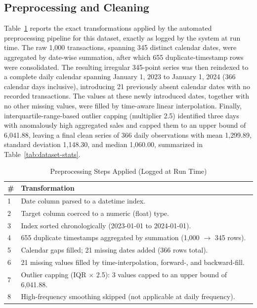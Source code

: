 \subsection{Preprocessing and Cleaning}
Table~\ref{tab:preprocessing-steps} reports the exact transformations applied by the automated preprocessing pipeline for this dataset, exactly as logged by the system at run time. The raw 1{,}000 transactions, spanning 345 distinct calendar dates, were aggregated by date-wise summation, after which 655 duplicate-timestamp rows were consolidated. The resulting irregular 345-point series was then reindexed to a complete daily calendar spanning January 1, 2023 to January 1, 2024 (366 calendar days inclusive), introducing 21 previously absent calendar dates with no recorded transactions. The values at these newly introduced dates, together with no other missing values, were filled by time-aware linear interpolation. Finally, interquartile-range-based outlier capping (multiplier 2.5) identified three days with anomalously high aggregated sales and capped them to an upper bound of 6{,}041.88, leaving a final clean series of 366 daily observations with mean 1{,}299.89, standard deviation 1{,}148.30, and median 1{,}060.00, summarized in Table~\ref{tab:dataset-stats}.

\begin{table}[!t]
\caption{Preprocessing Steps Applied (Logged at Run Time)}
\label{tab:preprocessing-steps}
\centering
\begin{tabular}{@{}p{0.5cm}p{7.3cm}@{}}
\toprule
\textbf{\#} & \textbf{Transformation} \\
\midrule
1 & Date column parsed to a datetime index. \\
2 & Target column coerced to a numeric (float) type. \\
3 & Index sorted chronologically (2023-01-01 to 2024-01-01). \\
4 & 655 duplicate timestamps aggregated by summation (1{,}000 $\rightarrow$ 345 rows). \\
5 & Calendar gaps filled; 21 missing dates added (366 rows total). \\
6 & 21 missing values filled by time-interpolation, forward-, and backward-fill. \\
7 & Outlier capping (IQR $\times$ 2.5): 3 values capped to an upper bound of 6{,}041.88. \\
8 & High-frequency smoothing skipped (not applicable at daily frequency). \\
\bottomrule
\end{tabular}
\end{table}

